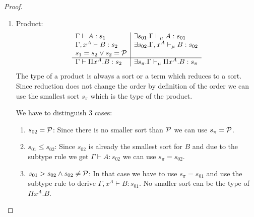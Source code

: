 \begin{theorem}
\begin{proof}
\begin{enumerate}
\begin{enumerate}
                \item Product:
                    $$
                    \begin{array}{l|l}
                        \Gamma \vdash A : s_1
                        &
                        \exists s_{01}. \Gamma \vdash_\mu A: s_{01}
                        \\
                        \Gamma, x^A \vdash B: s_2
                        &
                        \exists s_{02}. \Gamma,x^A \vdash_\mu B: s_{02}
                        \\
                        s_1 = s_2 \lor s_2 = {\cal P}
                        \\
                        \hline
                        \Gamma \vdash \Pi x^A. B : s_2
                        &
                        \exists s_\pi. \Gamma \vdash_\mu \Pi x^A. B: s_\pi
                    \end{array}
                    $$
                    The type of a product is always a sort or a term which
                    reduces to a sort. Since reduction does not change the order
                    by definition of the order we can use the smallest sort
                    $s_\pi$ which is the type of the product.

                    We have to distinguish 3 cases:
                    \begin{enumerate}
                        \item $s_{02} = {\cal P}$: Since there is no smaller sort
                            than ${\cal P}$ we can use $s_\pi = {\cal P}$.

                        \item $s_{01} \le s_{02}$: Since $s_{02}$ is already the
                            smallest sort for $B$ and due to the subtype rule we
                            get $\Gamma \vdash A: s_{02}$ we can use $s_\pi =
                            s_{02}$.

                        \item $s_{01} > s_{02} \land s_{02} \ne {\cal P}$: In that
                            case we have to use $s_\pi = s_{01}$ and use the
                            subtype rule to derive $\Gamma, x^A \vdash B:
                            s_{01}$. No smaller sort can be the type of $\Pi
                            x^A. B$.
                    \end{enumerate}




\end{enumerate}
\end{enumerate}
\end{proof}
\end{theorem}
